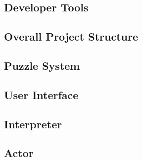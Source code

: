 \subsection{Developer Tools}

\newpage

\subsection{Overall Project Structure}

\newpage

\subsection{Puzzle System}

\newpage


\subsection{User Interface}

\newpage


\subsection{Interpreter}

\newpage

\subsection{Actor}

\newpage